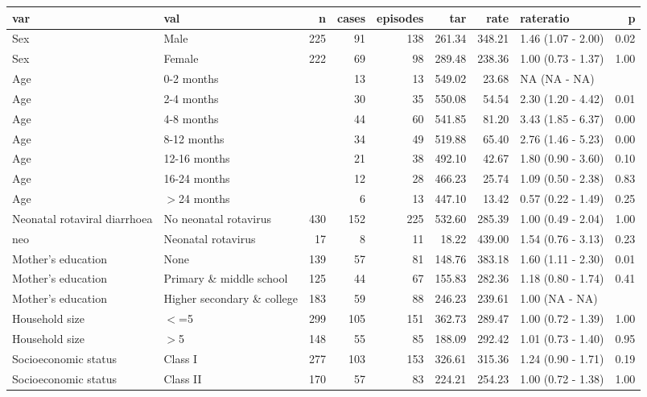 \documentclass[11pt,a4paper,twoside]{article}\usepackage{graphicx, color}
\begin{document}
\begin{sidewaystable}[ht]
\centering
\begin{tabular}{llrrrrrlr}
  \toprule
var & val & n & cases & episodes & tar & rate & rateratio & p \\ 
  \midrule
Sex & Male & 225 & 91 & 138 & 261.34 & 348.21 & 1.46 (1.07 - 2.00) & 0.02 \\ 
  Sex & Female & 222 & 69 & 98 & 289.48 & 238.36 & 1.00 (0.73 - 1.37) & 1.00 \\ 
  Age & 0-2 months &  & 13 & 13 & 549.02 & 23.68 & NA (NA - NA) &  \\ 
  Age & 2-4 months &  & 30 & 35 & 550.08 & 54.54 & 2.30 (1.20 - 4.42) & 0.01 \\ 
  Age & 4-8 months &  & 44 & 60 & 541.85 & 81.20 & 3.43 (1.85 - 6.37) & 0.00 \\ 
  Age & 8-12 months &  & 34 & 49 & 519.88 & 65.40 & 2.76 (1.46 - 5.23) & 0.00 \\ 
  Age & 12-16 months &  & 21 & 38 & 492.10 & 42.67 & 1.80 (0.90 - 3.60) & 0.10 \\ 
  Age & 16-24 months &  & 12 & 28 & 466.23 & 25.74 & 1.09 (0.50 - 2.38) & 0.83 \\ 
  Age & $>$24 months &  & 6 & 13 & 447.10 & 13.42 & 0.57 (0.22 - 1.49) & 0.25 \\ 
  Neonatal rotaviral diarrhoea & No neonatal rotavirus & 430 & 152 & 225 & 532.60 & 285.39 & 1.00 (0.49 - 2.04) & 1.00 \\ 
  neo & Neonatal rotavirus & 17 & 8 & 11 & 18.22 & 439.00 & 1.54 (0.76 - 3.13) & 0.23 \\ 
  Mother's education & None & 139 & 57 & 81 & 148.76 & 383.18 & 1.60 (1.11 - 2.30) & 0.01 \\ 
  Mother's education & Primary \& middle school & 125 & 44 & 67 & 155.83 & 282.36 & 1.18 (0.80 - 1.74) & 0.41 \\ 
  Mother's education & Higher secondary \& college & 183 & 59 & 88 & 246.23 & 239.61 & 1.00 (NA - NA) &  \\ 
  Household size & $<$=5 & 299 & 105 & 151 & 362.73 & 289.47 & 1.00 (0.72 - 1.39) & 1.00 \\ 
  Household size & $>$5 & 148 & 55 & 85 & 188.09 & 292.42 & 1.01 (0.73 - 1.40) & 0.95 \\ 
  Socioeconomic status & Class I & 277 & 103 & 153 & 326.61 & 315.36 & 1.24 (0.90 - 1.71) & 0.19 \\ 
  Socioeconomic status & Class II & 170 & 57 & 83 & 224.21 & 254.23 & 1.00 (0.72 - 1.38) & 1.00 \\ 

\end{tabular}
\end{sidewaystable}
\end{document}
